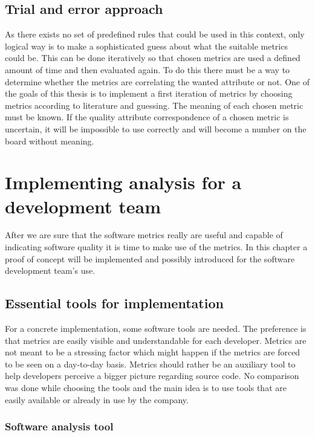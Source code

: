 \section{Trial and error approach}
As there exists no set of predefined rules that could be used in this context, only logical way is to make a sophisticated guess about what the suitable metrics could be. This can be done iteratively so that chosen metrics are used a defined amount of time and then evaluated again. To do this there must be a way to determine whether the metrics are correlating the wanted attribute or not. One of the goals of this thesis is to implement a first iteration of metrics by choosing metrics according to literature and guessing. The meaning of each chosen metric must be known. If the quality attribute correspondence of a chosen metric is uncertain, it will be impossible to use correctly and will become a number on the board without meaning.





\chapter{Implementing analysis for a development team}

After we are sure that the software metrics really are useful and capable of indicating software quality it is time to make use of the metrics. In this chapter a proof of concept will be implemented and possibly introduced for the software development team's use.

\section{Essential tools for implementation}

For a concrete implementation, some software tools are needed. The preference is that metrics are easily visible and understandable for each developer. Metrics are not meant to be a stressing factor which might happen if the metrics are forced to be seen on a day-to-day basis. Metrics should rather be an auxiliary tool to help developers perceive a bigger picture regarding source code. No comparison was done while choosing the tools and the main idea is to use tools that are easily available or already in use by the company.

\subsection{Software analysis tool}
\label{chap:sofanatool}

